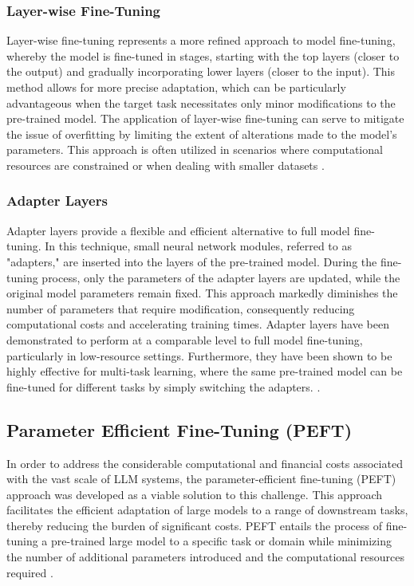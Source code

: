 \subsubsection{Layer-wise Fine-Tuning}
Layer-wise fine-tuning represents a more refined approach to model fine-tuning, whereby the model is fine-tuned in stages, starting with the top layers (closer to the output) and gradually incorporating lower layers (closer to the input). This method allows for more precise adaptation, which can be particularly advantageous when the target task necessitates only minor modifications to the pre-trained model. The application of layer-wise fine-tuning can serve to mitigate the issue of overfitting by limiting the extent of alterations made to the model's parameters. This approach is often utilized in scenarios where computational resources are constrained or when dealing with smaller datasets \cite{ro2021autolr}.

\subsubsection{Adapter Layers}

Adapter layers provide a flexible and efficient alternative to full model fine-tuning. In this technique, small neural network modules, referred to as "adapters," are inserted into the layers of the pre-trained model. During the fine-tuning process, only the parameters of the adapter layers are updated, while the original model parameters remain fixed. This approach markedly diminishes the number of parameters that require modification, consequently reducing computational costs and accelerating training times. Adapter layers have been demonstrated to perform at a comparable level to full model fine-tuning, particularly in low-resource settings. Furthermore, they have been shown to be highly effective for multi-task learning, where the same pre-trained model can be fine-tuned for different tasks by simply switching the adapters. \cite{houlsby2019parameter}.

\subsection{Parameter Efficient Fine-Tuning (PEFT)}

In order to address the considerable computational and financial costs associated with the vast scale of LLM systems, the parameter-efficient fine-tuning (PEFT) approach was developed as a viable solution to this challenge. This approach facilitates the efficient adaptation of large models to a range of downstream tasks, thereby reducing the burden of significant costs. PEFT entails the process of fine-tuning a pre-trained large model to a specific task or domain while minimizing the number of additional parameters introduced and the computational resources required \cite{han2024parameter}.

